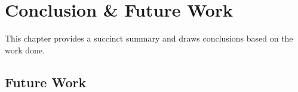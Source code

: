 \chapter{Conclusion \& Future Work}\label{chap:conclusion}

This chapter provides a succinct summary and draws conclusions based on the work done.

\section*{Future Work}